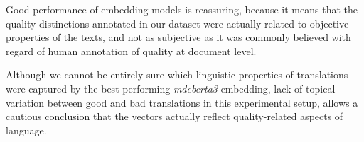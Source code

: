 Good performance of embedding models is reassuring, because it means that the quality distinctions annotated in our dataset were actually related to objective properties of the texts, and not as subjective as it was commonly believed with regard of human annotation of quality at document level. 

Although we cannot be entirely sure which linguistic properties of translations were captured by the best performing \textit{mdeberta3} embedding, lack of topical variation between good and bad translations in this experimental setup, allows a cautious conclusion that the vectors actually reflect quality-related aspects of language. 

